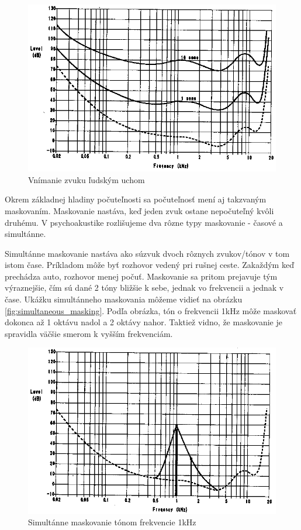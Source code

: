 \begin{figure}[htp]
    \centering
    \includegraphics{obrazky/informatika/audio/equi_loudness}
    \caption{Vnímanie zvuku ľudským uchom}
    \label{fig:equi_loudness}
\end{figure}

Okrem základnej hladiny počuteľnosti sa počuteľnosť mení aj takzvaným
maskovaním.
Maskovanie nastáva, keď jeden zvuk ostane nepočuteľný kvôli druhému. V
psychoakustike rozlišujeme dva rôzne typy maskovanie - časové a
simultánne.

Simultánne maskovanie nastáva ako súzvuk dvoch rôznych zvukov/tónov v tom
istom čase. Príkladom môže byť rozhovor vedený pri rušnej ceste.
Zakaždým keď prechádza auto, rozhovor menej počuť. Maskovanie sa
pritom prejavuje tým výraznejšie, čím sú dané 2 tóny bližšie k sebe,
jednak vo frekvencii a jednak v čase. Ukážku simultánneho maskovania
môžeme vidieť na obrázku \ref{fig:simultaneous_masking}. Podľa
obrázka, tón o frekvencii 1kHz môže maskovať dokonca až 1 oktávu nadol
a 2 oktávy nahor. Taktiež vidno, že maskovanie je spravidla väčšie
smerom k vyšším frekvenciám.

\begin{figure}[htp]
    \centering
    \includegraphics{obrazky/informatika/audio/simultaneous_masking}
    \caption{Simultánne maskovanie tónom frekvencie 1kHz}
    \label{fig:Simultaneous_masking}
\end{figure}

